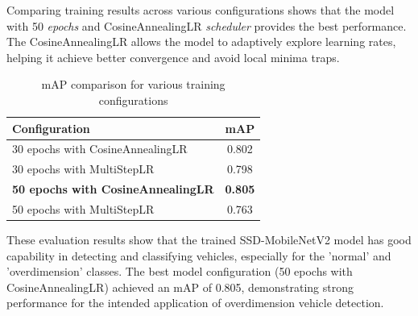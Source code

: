 Comparing training results across various configurations shows that the model with 50 \emph{epochs} and CosineAnnealingLR \emph{scheduler} provides the best performance. The CosineAnnealingLR allows the model to adaptively explore learning rates, helping it achieve better convergence and avoid local minima traps.

\begin{table}[htbp]
  \centering
  \begin{tabular}{|l|c|}
    \hline
    \rowcolor[HTML]{C0C0C0}
    \textbf{Configuration} & \textbf{mAP} \\
    \hline
    30 epochs with CosineAnnealingLR & 0.802 \\
    \hline
    30 epochs with MultiStepLR & 0.798 \\
    \hline
    \textbf{50 epochs with CosineAnnealingLR} & \textbf{0.805} \\
    \hline
    50 epochs with MultiStepLR & 0.763 \\
    \hline
  \end{tabular}
  \caption{mAP comparison for various training configurations}
  \label{fig:map_comparison}
\end{table}

These evaluation results show that the trained SSD-MobileNetV2 model has good capability in detecting and classifying vehicles, especially for the 'normal' and 'overdimension' classes. The best model configuration (50 epochs with CosineAnnealingLR) achieved an mAP of 0.805, demonstrating strong performance for the intended application of overdimension vehicle detection.



